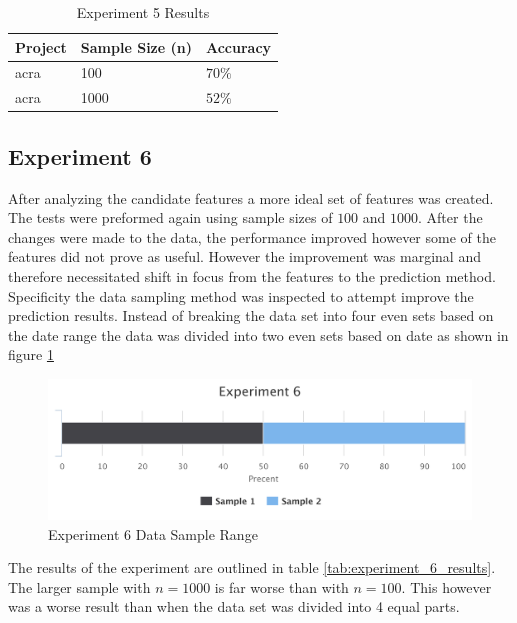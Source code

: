 \begin{table}
\begin{center}
    \begin{tabular}{|l|l|l|}
        \hline
        Project & Sample Size (n) & Accuracy \\
        \hline  
        acra & 100 & $70\%$ \\
        acra & 1000 & $52\%$ \\
        \hline
    \end{tabular}
\end{center}
    \caption{Experiment 5 Results}
    \label{tab:experiment_5_results}
\end{table}

\subsection{Experiment 6}

After analyzing the candidate features a more ideal set of features was created. The tests were preformed again using sample sizes of $100$ and $1000$. After the changes were made to the data, the performance improved however some of the features did not prove as useful. However the improvement was marginal and therefore necessitated shift in focus from the features to the prediction method. Specificity the data sampling method was inspected to attempt improve the prediction results. Instead of breaking the data set into four even sets based on the date range the data was divided into two even sets based on date as shown in figure \ref{fig:exp_6_data_range}

\begin{figure}[!ht]
    \centering
        \includegraphics[width=1.0\textwidth]{images/exp_6_data_range}
    \caption{Experiment 6 Data Sample Range}
    \label{fig:exp_6_data_range}
\end{figure}

The results of the experiment are outlined in table \ref{tab:experiment_6_results}. The larger sample with $n = 1000$ is far worse than with $n = 100$. This however was a worse result than when the data set was divided into 4 equal parts.

